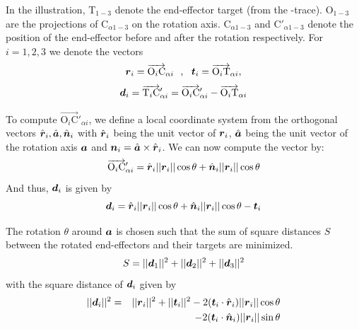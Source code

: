 In the illustration, T$_{1-3}$ denote the end-effector target (from the \Ca-trace). O$_{1-3}$ are the projections of C$_{\alpha1-3}$ on the rotation axis. C$_{\alpha1-3}$ and C$'_{\alpha1-3}$ denote the position of the end-effector before and after the rotation respectively.
For $i=1,2,3$ we denote the vectors
 $$\boldsymbol{r}_i = \overrightarrow{\text{O}_i\text{C}}_{\alpha i}~~,~~ \boldsymbol{t}_i = \overrightarrow{\text{O}_i\text{T}}_{\alpha i} , $$
$$\boldsymbol{d}_i = \overrightarrow{\text{T}_i\text{C}}'_{\alpha i} = \overrightarrow{\text{O}_i\text{C}}'_{\alpha i}-\overrightarrow{\text{O}_i\text{T}}_{\alpha i}$$

To compute $\overrightarrow{\text{O}_i\text{C}}'_{\alpha i}$, we define a local coordinate system from the orthogonal vectors $\hat{\boldsymbol{r}}_i, \hat{\boldsymbol{a}}, \hat{\boldsymbol{n}}_i$ with $\hat{\boldsymbol{r}}_i$ being the unit vector of $\boldsymbol{r}_i$, $\hat{\boldsymbol{a}}$ being the unit vector of the rotation axis $\boldsymbol{a}$ and $\boldsymbol{n}_i = \hat{\boldsymbol{a}} \times \hat{\boldsymbol{r}}_i$. We can now compute the vector by:
$$\overrightarrow{\text{O}_i\text{C}}'_{\alpha i} = \hat{\boldsymbol{r}}_i||\boldsymbol{r}_i||\cos\theta + \hat{\boldsymbol{n}}_i||\boldsymbol{r}_i||\cos\theta$$
And thus, $\boldsymbol{d}_i$ is given by
$$\boldsymbol{d}_i =  \hat{\boldsymbol{r}}_i||\boldsymbol{r}_i||\cos\theta + \hat{\boldsymbol{n}}_i||\boldsymbol{r}_i||\cos\theta - \boldsymbol{t}_i$$

The rotation $\theta$ around $\boldsymbol{a}$ is chosen such that the sum of square distances $S$ between the rotated end-effectors and their targets are minimized.
$$S=||\boldsymbol{d}_1||^2+||\boldsymbol{d}_2||^2+||\boldsymbol{d}_3||^2$$
with the square distance of $\boldsymbol{d}_i$ given by
\begin{eqnarray*}
||\boldsymbol{d}_i||^2 &=& ||\boldsymbol{r}_i||^2 + ||\boldsymbol{t}_i||^2 - 2(\boldsymbol{t}_i\cdot\hat{\boldsymbol{r}}_i)||\boldsymbol{r}_i||\cos\theta\\
&& - 2(\boldsymbol{t}_i\cdot\hat{\boldsymbol{n}}_i)||\boldsymbol{r}_i||\sin\theta
\end{eqnarray*}

